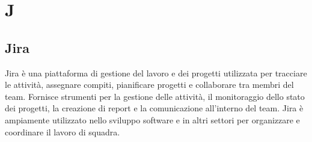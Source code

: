 \section{J} 
\subsection{Jira} 
Jira è una piattaforma di gestione del lavoro e dei progetti utilizzata per tracciare le attività, assegnare compiti, pianificare progetti e collaborare tra membri del team. Fornisce strumenti per la gestione delle attività, il monitoraggio dello stato dei progetti, la creazione di report e la comunicazione all'interno del team. Jira è ampiamente utilizzato nello sviluppo software e in altri settori per organizzare e coordinare il lavoro di squadra.
